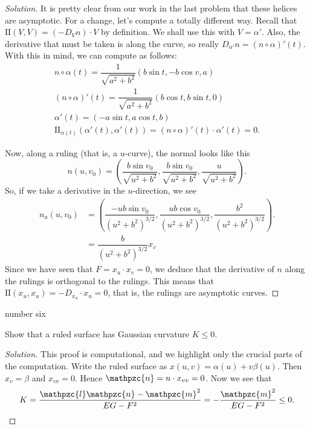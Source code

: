 \documentclass[Shifrin_Solutions_Spring_2018]{subfiles}
\begin{document}
\begin{proof}[Solution]
It is pretty clear from our work in the last problem that these helices are asymptotic. For a change, let's compute a totally different way. Recall that $\mathrm{II}(V,V) = \left( -D_{V}n\right) \cdot V$ by definition. We shall use this with $V = \alpha'$. Also, the derivative that must be taken is along the curve, so really $D_{\alpha'}n = (n\circ \alpha)'(t)$. With this in mind, we can compute as follows:
\begin{align*}
n\circ \alpha(t) = \dfrac{1}{\sqrt{a^2+b^2}} \left( b \sin t , -b \cos v , a \right) \\
(n\circ \alpha)'(t) = \dfrac{1}{\sqrt{a^2+b^2}}\left( b\cos t , b \sin t , 0 \right)\\
\alpha'(t) = \left( -a\sin t , a\cos t , b\right) \\
\mathrm{II}_{\alpha(t)}(\alpha'(t), \alpha'(t) ) = (n\circ\alpha)'(t) \cdot \alpha'(t) = 0.
\end{align*}

Now, along a ruling (that is, a $u$-curve), the normal looks like this
\[
n(u,v_0) = \left( \dfrac{b\sin v_0}{\sqrt{u^2 + b^2}} , \dfrac{b\sin v_0}{\sqrt{u^2 + b^2}} , \dfrac{u}{\sqrt{u^2 + b^2}}\right).
\]
So, if we take a derivative in the $u$-direction, we see
\[
\begin{split}
n_u (u,v_0) & = \left( \dfrac{-ub\sin v_0}{(u^2+b^2)^{3/2}}, \dfrac{ub\cos v_0}{(u^2+b^2)^{3/2}} , \dfrac{b^2}{(u^2+b^2)^{3/2}}\right) . \\
	& = \dfrac{b}{(u^2+b^2)^{3/2}} x_v
\end{split}
\]
Since we have seen that $F = x_u\cdot x_v = 0$, we deduce that the derivative of $n$ along the rulings is orthogonal to the rulings. This means that $\mathrm{II}(x_u,x_u) = -D_{x_u} \cdot x_u =0$, that is, the rulings are asymptotic curves.
\end{proof}

\begin{exercise}
number six
\end{exercise}

\begin{exercise}
Show that a ruled surface has Gaussian curvature $K\leq 0$.
\end{exercise}

\begin{proof}[Solution]
This proof is computational, and we highlight only the crucial parts of the computation. Write the ruled surface as $x(u,v) = \alpha(u)+ v\beta(u)$. Then $x_v = \beta$ and $x_{vv} = 0$. Hence $\mathpzc{n} = n\cdot x_{vv} = 0$. Now we see that
\[
K = \dfrac{\mathpzc{l}\mathpzc{n}- \mathpzc{m}^2}{EG-F^2} = - \dfrac{ \mathpzc{m}^2}{EG-F^2} \leq 0 .
\]
\end{proof}
\end{document}
